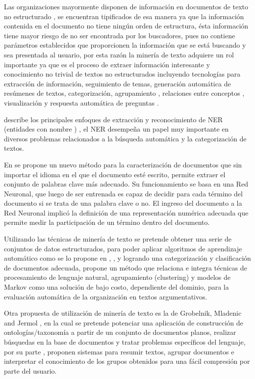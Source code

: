 Las organizaciones mayormente disponen de información en documentos de texto no estructurado ,
se encuentran tipificados de esa manera ya que la información contenida en el documento no tiene ningún orden de estructura, ésta
información tiene mayor riesgo de no ser encontrada por los buscadores, pues no contiene parámetros establecidos que proporcionen
la información que se está buscando y sea presentada al usuario, por esta razón la minería de texto adquiere un rol importante
ya que es el proceso de extraer información interesante y conocimiento no trivial de textos no estructurados incluyendo tecnologías 
para extracción de información, seguimiento de temas, generación automática de resúmenes de textos, categorización,
agrupamiento , relaciones entre conceptos , visualización y respuesta automática de preguntas .  

\cite{troyano2003identificacion} describe los principales enfoques de extracción y reconocimiento de NER (entidades con nombre ) , 
el NER desempeña un papel muy importante en diversos problemas relacionados a la búsqueda automática y la categorización de textos.
 
En \cite{figuerola2004algunas} se propone un nuevo método para la caracterización de documentos que sin importar el idioma en el que el 
documento esté escrito, permite extraer el conjunto de palabras clave más adecuado. Su funcionamiento se basa en una Red Neuronal, que
luego de ser entrenada es capaz de decidir para cada término del documento si se trata de una palabra clave o no. El ingreso del documento a la Red Neuronal implicó la definición de una representación numérica adecuada que permite medir la participación de un término dentro del documento.

Utilizando  las técnicas de minería de texto se pretende obtener una serie de conjuntos de datos estructurados, 
para poder aplicar algoritmos de aprendizaje automático como se lo propone en \cite{llorens1998caracteristicas}, 
\cite{santana2014aplicacion}, \cite{barrera2016mineria} y \cite{rodriguez2018metodos}  logrando una categorización
y clasificación de documentos adecuada, \cite{ropero2014metodo}  propone un método que relaciona e integra técnicas de procesamiento de lenguaje natural,
agrupamiento (clustering) y modelos de Markov como una solución de bajo costo, dependiente del dominio, para la evaluación automática 
de la organización en textos argumentativos. 

Otra propuesta de utilización de minería de texto es la de Grobelnik, Mladenic  and Jermol  \cite{grobelnik2002exploiting}, en la cual se pretende potenciar una aplicación de construcción de ontologías/taxonomía a
partir de un conjunto de documentos planos, realizar búsquedas en la base de documentos y tratar problemas específicos del lenguaje,
por su parte \cite{cobo2006tecnicas},\cite{neto2000document} proponen sistemas  para resumir textos, agrupar documentos e interpretar el conocimiento de los grupos obtenidos para una  fácil compresión  por parte  del usuario.

